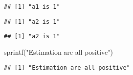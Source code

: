 \documentclass[
]{article}
\newenvironment{Shaded}{\begin{snugshade}}{\end{snugshade}}
\newcommand{\FunctionTok}[1]{\textcolor[rgb]{0.00,0.00,0.00}{#1}}
\newcommand{\NormalTok}[1]{#1}
\newcommand{\OtherTok}[1]{\textcolor[rgb]{0.56,0.35,0.01}{#1}}
\newcommand{\SpecialCharTok}[1]{\textcolor[rgb]{0.00,0.00,0.00}{#1}}
\newcommand{\StringTok}[1]{\textcolor[rgb]{0.31,0.60,0.02}{#1}}
\begin{document}
\begin{Shaded}
\end{Shaded}

\begin{verbatim}
## [1] "a1 is 1"
\end{verbatim}

\begin{Shaded}
\end{Shaded}

\begin{verbatim}
## [1] "a2 is 1"
\end{verbatim}

\begin{Shaded}
\end{Shaded}

\begin{verbatim}
## [1] "a2 is 1"
\end{verbatim}

\begin{Shaded}
\begin{Highlighting}[]
\FunctionTok{sprintf}\NormalTok{(}\StringTok{"Estimation are all positive"}\NormalTok{)}
\end{Highlighting}
\end{Shaded}

\begin{verbatim}
## [1] "Estimation are all positive"
\end{verbatim}
\end{document}
